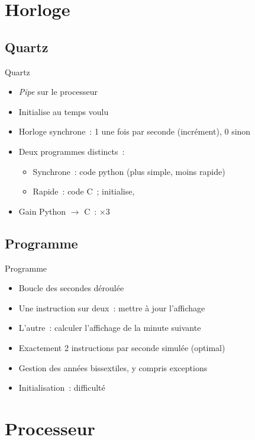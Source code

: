 \documentclass[11pt]{beamer}
\begin{document}
\section{Horloge}

\subsection{Quartz}

\begin{frame}{Quartz}
\begin{itemize}
\item \textit{Pipe} sur le processeur
\item Initialise au temps voulu
\item Horloge synchrone~: \alert{1} une fois par seconde (incrément), \alert{0} sinon
\item Deux programmes distincts~:
	\begin{itemize}
	\item Synchrone~: code python (plus simple, moins rapide)
	\item Rapide~: code C~; initialise, 
	\end{itemize}
\item Gain Python $\rightarrow$ C~: $\times 3$
\end{itemize}
\end{frame}

\subsection{Programme}
\begin{frame}{Programme}
\begin{itemize}
\item{Boucle des secondes déroulée}
\item{Une instruction sur deux~: mettre à jour l'affichage}
\item{L'autre~: calculer l'affichage de la minute suivante}
\item{Exactement 2 instructions par seconde simulée (optimal)}
\item{Gestion des années bissextiles, y compris exceptions}
\item{Initialisation~: difficulté}
\end{itemize}
\end{frame}


\section{Processeur}
\end{document}
